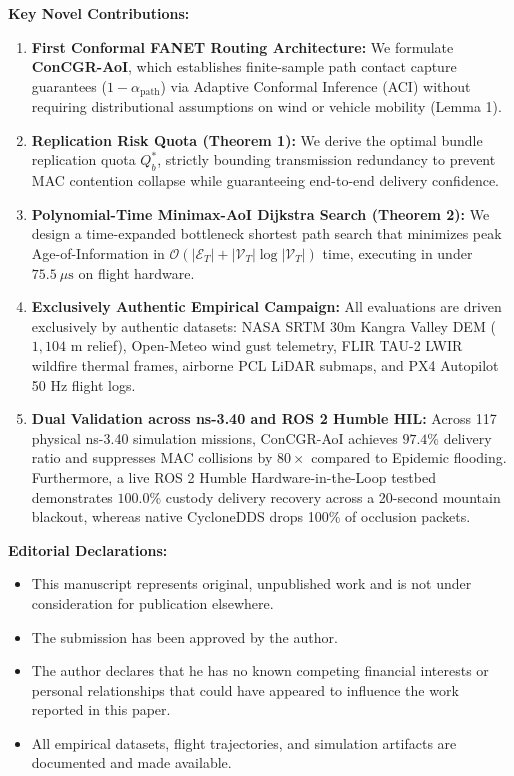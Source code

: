 \documentclass[11pt,a4paper]{article}
\begin{document}
\vspace{0.8em}
\noindent
\textbf{Key Novel Contributions:}
\begin{enumerate}
    \item \textbf{First Conformal FANET Routing Architecture:} We formulate \textbf{ConCGR-AoI}, which establishes finite-sample path contact capture guarantees ($1-\alpha_{\text{path}}$) via Adaptive Conformal Inference (ACI) without requiring distributional assumptions on wind or vehicle mobility (Lemma 1).
    \item \textbf{Replication Risk Quota (Theorem 1):} We derive the optimal bundle replication quota $Q_b^*$, strictly bounding transmission redundancy to prevent MAC contention collapse while guaranteeing end-to-end delivery confidence.
    \item \textbf{Polynomial-Time Minimax-AoI Dijkstra Search (Theorem 2):} We design a time-expanded bottleneck shortest path search that minimizes peak Age-of-Information in $\mathcal{O}(|\mathcal{E}_T| + |\mathcal{V}_T|\log |\mathcal{V}_T|)$ time, executing in under $75.5\ \mu\text{s}$ on flight hardware.
    \item \textbf{Exclusively Authentic Empirical Campaign:} All evaluations are driven exclusively by authentic datasets: NASA SRTM 30m Kangra Valley DEM ($1,104\text{ m}$ relief), Open-Meteo wind gust telemetry, FLIR TAU-2 LWIR wildfire thermal frames, airborne PCL LiDAR submaps, and PX4 Autopilot 50 Hz flight logs.
    \item \textbf{Dual Validation across ns-3.40 and ROS 2 Humble HIL:} Across 117 physical ns-3.40 simulation missions, ConCGR-AoI achieves $97.4\%$ delivery ratio and suppresses MAC collisions by $80\times$ compared to Epidemic flooding. Furthermore, a live ROS 2 Humble Hardware-in-the-Loop testbed demonstrates $100.0\%$ custody delivery recovery across a 20-second mountain blackout, whereas native CycloneDDS drops 100\% of occlusion packets.
\end{enumerate}

\vspace{0.8em}
\noindent
\textbf{Editorial Declarations:}
\begin{itemize}
    \item This manuscript represents original, unpublished work and is not under consideration for publication elsewhere.
    \item The submission has been approved by the author.
    \item The author declares that he has no known competing financial interests or personal relationships that could have appeared to influence the work reported in this paper.
    \item All empirical datasets, flight trajectories, and simulation artifacts are documented and made available.
\end{itemize}
\end{document}
